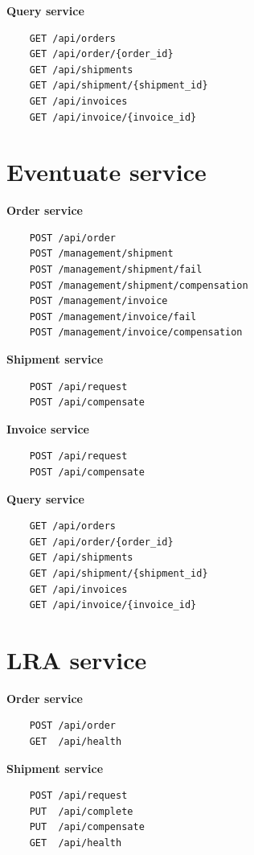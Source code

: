\documentclass[oneside,
  digital, %
  table,   %
  nolof,     %
  nolot,     %
]{fithesis3}
\begin{document}
\noindent
\textbf{Query service}

\begin{verbatim}
    GET /api/orders
    GET /api/order/{order_id}
    GET /api/shipments
    GET /api/shipment/{shipment_id}
    GET /api/invoices
    GET /api/invoice/{invoice_id}
\end{verbatim}

\section{Eventuate service}

\textbf{Order service}

\begin{verbatim}
    POST /api/order
    POST /management/shipment
    POST /management/shipment/fail
    POST /management/shipment/compensation
    POST /management/invoice
    POST /management/invoice/fail
    POST /management/invoice/compensation
\end{verbatim}

\noindent
\textbf{Shipment service}

\begin{verbatim}
    POST /api/request
    POST /api/compensate
\end{verbatim}

\noindent
\textbf{Invoice service}

\begin{verbatim}
    POST /api/request
    POST /api/compensate
\end{verbatim}

\noindent
\textbf{Query service}

\begin{verbatim}
    GET /api/orders
    GET /api/order/{order_id}
    GET /api/shipments
    GET /api/shipment/{shipment_id}
    GET /api/invoices
    GET /api/invoice/{invoice_id}
\end{verbatim}

\section{LRA service}

\textbf{Order service}

\begin{verbatim}
    POST /api/order
    GET  /api/health
\end{verbatim}

\noindent
\textbf{Shipment service}

\begin{verbatim}
    POST /api/request
    PUT  /api/complete
    PUT  /api/compensate
    GET  /api/health
\end{verbatim}
\end{document}
